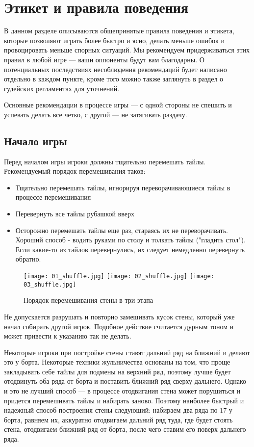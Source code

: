 \section{Этикет и правила поведения}

В данном разделе описываются общепринятые правила поведения и этикета, которые позволяют играть более быстро и ясно, делать меньше ошибок и провоцировать меньше спорных ситуаций. Мы рекомендуем придерживаться этих правил в любой игре --- ваши оппоненты будут вам благодарны. О потенциальных последствиях несоблюдения рекомендаций будет написано отдельно в каждом пункте, кроме того можно также заглянуть в раздел о судейских регламентах для уточнений.

Основные рекомендации в процессе игры --- с одной стороны не спешить и успевать делать все четко, с другой --- не затягивать раздачу. 

\newpage

\subsection {Начало игры}

Перед началом игры игроки должны тщательно перемешать тайлы. Рекомендуемый порядок перемешивания таков:

\begin{itemize}
	\item Тщательно перемешать тайлы, игнорируя переворачивающиеся тайлы в процессе перемешивания
	\item Перевернуть все тайлы рубашкой вверх
	\item Осторожно перемешать тайлы еще раз, стараясь их не переворачивать. Хороший способ - водить руками по столу и толкать тайлы ("гладить стол"). Если какие-то из тайлов перевернулись, их следует немедленно перевернуть обратно.
\end{itemize}

\begin{figure}[H]
	\centering
	\texttt{[image: 01\_shuffle.jpg]}
	\texttt{[image: 02\_shuffle.jpg]}
	\texttt{[image: 03\_shuffle.jpg]}
	\caption{Порядок перемешивания стены в три этапа}
\end{figure}

Не допускается разрушать и повторно замешивать кусок стены, который уже начал собирать другой игрок. Подобное действие считается дурным тоном и может привести к указанию так не делать.

Некоторые игроки при постройке стены ставят дальний ряд на ближний и делают это у борта. Некоторые техники жульничества основаны на том, что проще закладывать себе тайлы для подмены на верхний ряд, поэтому лучше будет отодвинуть оба ряда от борта и поставить ближний ряд сверху дальнего. Однако и это не лучший способ --- в процессе отодвигания стена может порушиться и придется перемешивать тайлы и набирать заново. Поэтому наиболее быстрый и надежный способ построения стены следующий: набираем два ряда по 17 у борта, равняем их, аккуратно отодвигаем дальний ряд туда, где будет стоять стена, отодвигаем ближний ряд от борта, после чего ставим его поверх дальнего ряда. 

